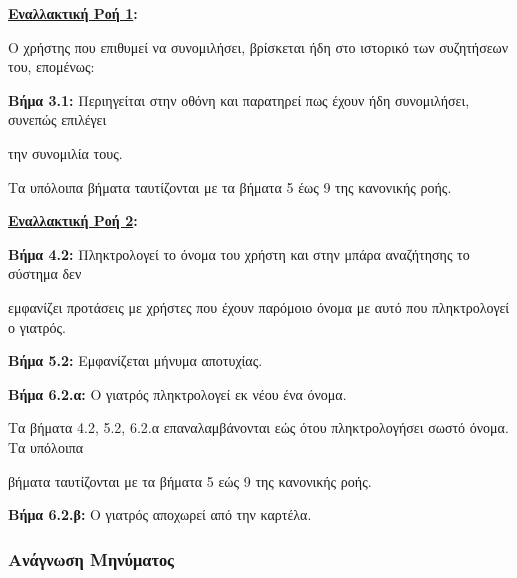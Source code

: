 \documentclass{article}
\begin{document}
 \textbf{\underline{Εναλλακτική Ροή 1}:} \vspace{0.2cm}
\par Ο χρήστης που επιθυμεί να συνομιλήσει, βρίσκεται ήδη στο ιστορικό των συζητήσεων του, επομένως: \vspace{0.005cm}
\par \textbf{Βήμα 3.1:} Περιηγείται στην οθόνη και παρατηρεί πως έχουν ήδη συνομιλήσει, συνεπώς επιλέγει \par την συνομιλία τους.  \vspace{0.1cm}

\par Τα υπόλοιπα βήματα ταυτίζονται με τα βήματα 5 έως 9 της κανονικής ροής.\vspace{0.2cm}

\textbf{\underline{Εναλλακτική Ροή 2}:} \vspace{0.2cm}
\par \textbf{Βήμα 4.2:} Πληκτρολογεί το όνομα του χρήστη και στην μπάρα αναζήτησης το σύστημα δεν \par εμφανίζει προτάσεις με χρήστες που έχουν παρόμοιο όνομα με αυτό που πληκτρολογεί ο γιατρός. \vspace{0.1cm}
\par \textbf{Βήμα 5.2:} Εμφανίζεται μήνυμα αποτυχίας. \vspace{0.1cm}
\par \textbf{Βήμα 6.2.α:} Ο γιατρός πληκτρολογεί εκ νέου ένα όνομα.\vspace{0.1cm}
\par Τα βήματα 4.2, 5.2, 6.2.α επαναλαμβάνονται εώς ότου πληκτρολογήσει σωστό όνομα. Τα υπόλοιπα \par βήματα ταυτίζονται με τα βήματα 5 εώς 9 της κανονικής ροής. \vspace{0.1cm}
\par \textbf{Βήμα 6.2.β:} Ο γιατρός αποχωρεί από την καρτέλα.

\subsubsection{Ανάγνωση Μηνύματος}
\end{document}
